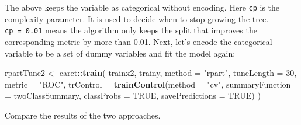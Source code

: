 \documentclass[12pt,]{krantz}
\makeatletter
\newenvironment{Shaded}{\begin{snugshade}}{\end{snugshade}}
\newcommand{\DataTypeTok}[1]{\textcolor[rgb]{0.27,0.27,0.27}{#1}}
\newcommand{\DecValTok}[1]{\textcolor[rgb]{0.06,0.06,0.06}{#1}}
\newcommand{\KeywordTok}[1]{\textcolor[rgb]{0.27,0.27,0.27}{\textbf{#1}}}
\newcommand{\NormalTok}[1]{#1}
\newcommand{\OperatorTok}[1]{\textcolor[rgb]{0.43,0.43,0.43}{\textbf{#1}}}
\newcommand{\OtherTok}[1]{\textcolor[rgb]{0.37,0.37,0.37}{#1}}
\newcommand{\StringTok}[1]{\textcolor[rgb]{0.5,0.5,0.5}{#1}}
\newenvironment{kframe}{%
\medskip{}
\setlength{\fboxsep}{.8em}
 \def\at@end@of@kframe{}%
 \ifinner\ifhmode%
  \def\at@end@of@kframe{\end{minipage}}%
  \begin{minipage}{\columnwidth}%
 \fi\fi%
 \def\FrameCommand##1{\hskip\@totalleftmargin \hskip-\fboxsep
 \colorbox{shadecolor}{##1}\hskip-\fboxsep
     \hskip-\linewidth \hskip-\@totalleftmargin \hskip\columnwidth}%
 \MakeFramed {\advance\hsize-\width
   \@totalleftmargin\z@ \linewidth\hsize
   \@setminipage}}%
 {\par\unskip\endMakeFramed%
 \at@end@of@kframe}
\renewenvironment{Shaded}{\begin{kframe}}{\end{kframe}}
\makeatother
\begin{document}
The above keeps the variable as categorical without encoding. Here \texttt{cp} is the complexity parameter. It is used to decide when to stop growing the tree. \texttt{cp\ =\ 0.01} means the algorithm only keeps the split that improves the corresponding metric by more than 0.01. Next, let's encode the categorical variable to be a set of dummy variables and fit the model again:

\begin{Shaded}
\begin{Highlighting}[]
\NormalTok{rpartTune2 <-}\StringTok{ }\NormalTok{caret}\OperatorTok{::}\KeywordTok{train}\NormalTok{(}
\NormalTok{  trainx2, trainy, }\DataTypeTok{method =} \StringTok{"rpart"}\NormalTok{,}
  \DataTypeTok{tuneLength =} \DecValTok{30}\NormalTok{,}
  \DataTypeTok{metric =} \StringTok{"ROC"}\NormalTok{, }
  \DataTypeTok{trControl =} \KeywordTok{trainControl}\NormalTok{(}\DataTypeTok{method =} \StringTok{"cv"}\NormalTok{,}
                           \DataTypeTok{summaryFunction =}\NormalTok{ twoClassSummary,}
                           \DataTypeTok{classProbs =} \OtherTok{TRUE}\NormalTok{,}
                           \DataTypeTok{savePredictions =} \OtherTok{TRUE}\NormalTok{)}
\NormalTok{  )}
\end{Highlighting}
\end{Shaded}

Compare the results of the two approaches.
\end{document}
